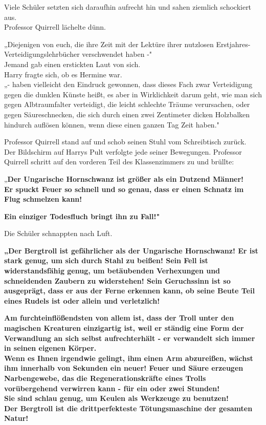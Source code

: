 {Viele Schüler setzten sich daraufhin aufrecht hin und sahen ziemlich schockiert aus.\\ Professor Quirrell lächelte dünn.

„Diejenigen von euch, die ihre Zeit mit der Lektüre ihrer nutzlosen Erstjahres-Verteidigungslehrbücher verschwendet haben -"\\ Jemand gab einen erstickten Laut von sich.\\ Harry fragte sich, ob es Hermine war.\\ „- haben vielleicht den Eindruck gewonnen, dass dieses Fach zwar Verteidigung gegen die dunklen Künste heißt, es aber in Wirklichkeit darum geht, wie man sich gegen Albtraumfalter verteidigt, die leicht schlechte Träume verursachen, oder gegen Säureschnecken, die sich durch einen zwei Zentimeter dicken Holzbalken hindurch auflösen können, wenn diese einen ganzen Tag Zeit haben."

Professor Quirrell stand auf und schob seinen Stuhl vom Schreibtisch zurück.\\ Der Bildschirm auf Harrys Pult verfolgte jede seiner Bewegungen. Professor Quirrell schritt auf den vorderen Teil des Klassenzimmers zu und brüllte:

„\textbf{Der Ungarische Hornschwanz ist größer als ein Dutzend Männer!}\\ \textbf{Er spuckt Feuer so schnell und so genau, dass er einen Schnatz im Flug schmelzen kann!}

\textbf{Ein einziger Todesfluch bringt ihn zu Fall!"}

Die Schüler schnappten nach Luft.

\textbf{„Der Bergtroll ist gefährlicher als der Ungarische Hornschwanz! Er ist stark genug, um sich durch Stahl zu beißen! Sein Fell ist widerstandsfähig genug, um betäubenden Verhexungen und schneidenden Zaubern zu widerstehen! Sein Geruchssinn ist so ausgeprägt, dass er aus der Ferne erkennen kann, ob seine Beute Teil eines Rudels ist oder allein und verletzlich!}

\textbf{Am furchteinflößendsten von allem ist, dass der Troll unter den magischen Kreaturen einzigartig ist, weil er ständig eine Form der Verwandlung an sich selbst aufrechterhält - er verwandelt sich immer in seinen eigenen Körper.}\\ \textbf{\hfill\break Wenn es Ihnen irgendwie gelingt, ihm einen Arm abzureißen, wächst ihm innerhalb von Sekunden ein neuer! Feuer und Säure erzeugen Narbengewebe, das die Regenerationskräfte eines Trolls vorübergehend verwirren kann - für ein oder zwei Stunden!\\ Sie sind schlau genug, um Keulen als Werkzeuge zu benutzen!}\\ \textbf{Der Bergtroll ist die drittperfekteste Tötungsmaschine der gesamten Natur!}\\

}
